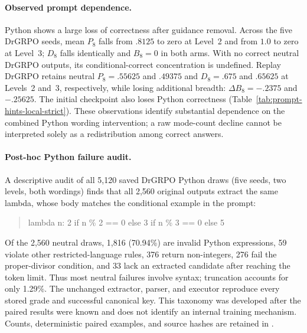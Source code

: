 \documentclass{article}
\newcommand{\1}{\mathbf 1}
\theoremstyle{remark}
\theoremstyle{definition}
\theoremstyle{plain}
\begin{document}
\paragraph{Observed prompt dependence.}
Python shows a large loss of correctness after guidance removal. Across the
five DrGRPO seeds, mean $P_8$ falls from $.8125$ to zero at Level~2 and from
$1.0$ to zero at Level~3; $D_8$ falls identically and $B_8=0$ in both arms.
With no correct neutral DrGRPO outputs, its conditional-correct concentration
is undefined. Replay DrGRPO retains neutral $P_8=.55625$ and $.49375$ and
$D_8=.675$ and $.65625$ at Levels~2 and~3, respectively, while losing
additional breadth: $\Delta B_8=-.2375$ and $-.25625$. The initial checkpoint
also loses Python correctness (Table~\ref{tab:prompt-hints-local-strict}).
These observations identify substantial dependence on the combined Python
wording intervention; a raw mode-count decline cannot be interpreted solely
as a redistribution among correct answers.


\paragraph{Post-hoc Python failure audit.}
A descriptive audit of all 5,120 saved DrGRPO Python draws (five seeds,
two levels, both wordings) finds that all 2,560 original outputs extract
the same lambda, whose body matches the conditional example in the prompt:
\begin{quote}\footnotesize\ttfamily
lambda n: 2 if n \% 2 == 0 else 3 if n \% 3 == 0 else 5
\end{quote}
Of the 2,560 neutral draws, 1,816 (70.94\%) are invalid Python expressions,
59 violate other restricted-language rules, 376 return non-integers,
276 fail the proper-divisor condition, and 33 lack an extracted candidate
after reaching the token limit. Thus most neutral failures involve syntax;
truncation accounts for only 1.29\%. The unchanged extractor, parser, and
executor reproduce every stored grade and successful canonical key.
This taxonomy was developed after the paired results were known and does
not identify an internal training mechanism. Counts, deterministic paired
examples, and source hashes are retained in
.
\end{document}

